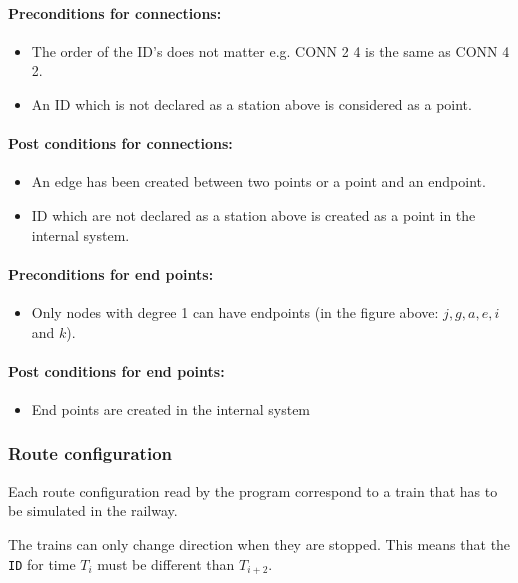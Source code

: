 \documentclass[10pt,a4paper]{article}
\def\Code#1{\texttt{#1}}
\begin{document}
\paragraph{Preconditions for connections:}
\begin{itemize}
  \item The order of the ID’s does not matter e.g. CONN 2 4 is the same as CONN 4 2.
  \item An ID which is not declared as a station above is considered as a point.
\end{itemize}

\paragraph{Post conditions for connections:}
\begin{itemize}
  \item An edge has been created between two points or a point and an endpoint.
  \item ID which are not declared as a station above is created as a point in the internal system.
\end{itemize} 

\paragraph{Preconditions for end points:}
\begin{itemize}
  \item Only nodes with degree 1 can have endpoints (in the figure above: $j, g, a, e, i$ and $k$).
\end{itemize}
 
\paragraph{Post conditions for end points:}
\begin{itemize}
  \item End points are created in the internal system
\end{itemize}

\subsubsection{Route configuration}
 
Each route configuration read by the program correspond to a train that has to be simulated in the railway.
 
The trains can only change direction when they are stopped. This means that the \Code{ID} for time $T_i$ must be different than $T_{i+2}$.
 
\end{document}
